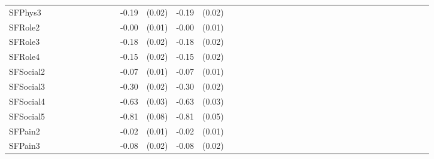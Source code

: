 {\begin{tabular}{l*{6}{llllll}}
SFPhys3             &                     &            &                     &            &                     &            &                     &            &       -0.19\sym{***}&      (0.02)&       -0.19\sym{***}&      (0.02)\\
SFRole2             &                     &            &                     &            &                     &            &                     &            &       -0.00         &      (0.01)&       -0.00         &      (0.01)\\
SFRole3             &                     &            &                     &            &                     &            &                     &            &       -0.18\sym{***}&      (0.02)&       -0.18\sym{***}&      (0.02)\\
SFRole4             &                     &            &                     &            &                     &            &                     &            &       -0.15\sym{***}&      (0.02)&       -0.15\sym{***}&      (0.02)\\
SFSocial2           &                     &            &                     &            &                     &            &                     &            &       -0.07\sym{***}&      (0.01)&       -0.07\sym{***}&      (0.01)\\
SFSocial3           &                     &            &                     &            &                     &            &                     &            &       -0.30\sym{***}&      (0.02)&       -0.30\sym{***}&      (0.02)\\
SFSocial4           &                     &            &                     &            &                     &            &                     &            &       -0.63\sym{***}&      (0.03)&       -0.63\sym{***}&      (0.03)\\
SFSocial5           &                     &            &                     &            &                     &            &                     &            &       -0.81\sym{***}&      (0.08)&       -0.81\sym{***}&      (0.05)\\
SFPain2             &                     &            &                     &            &                     &            &                     &            &       -0.02         &      (0.01)&       -0.02         &      (0.01)\\
SFPain3             &                     &            &                     &            &                     &            &                     &            &       -0.08\sym{***}&      (0.02)&       -0.08\sym{***}&      (0.02)\\

\end{tabular}}
